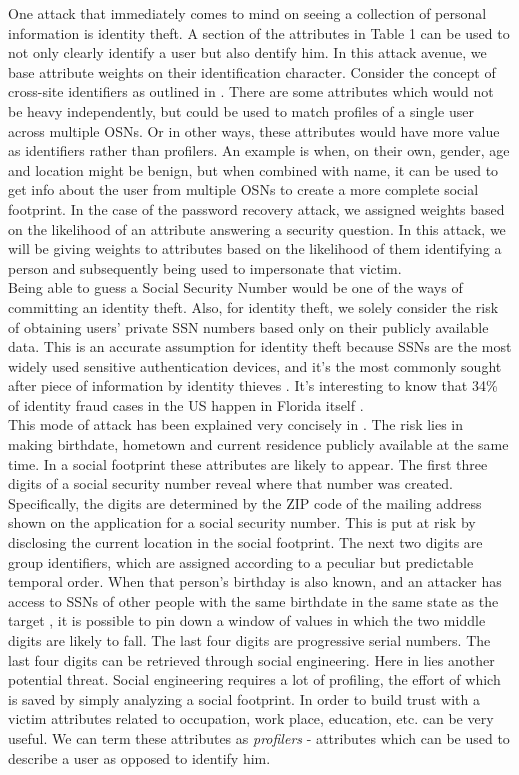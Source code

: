 \documentclass[10pt,conference]{IEEEtran}
\begin{document}
One attack that immediately comes to mind on seeing a collection of personal information is identity theft. A section of the attributes in Table 1 can be used to not only clearly identify a user but also dentify him. In this attack avenue, we base attribute weights on their identification character. Consider the concept of cross-site identifiers as outlined in \cite{emergingthreat}. There are some attributes which would not be heavy independently, but could be used to match profiles of a single user across multiple OSNs. Or in other ways, these attributes would have more value as identifiers rather than profilers. An example is when, on their own, gender, age and location might be benign, but when combined with name, it can be used to get info about the user from multiple OSNs to create a more complete social footprint. In the case of the password recovery attack, we assigned weights based on the likelihood of an attribute answering a security question. In this attack, we will be giving weights to attributes based on the likelihood of them identifying a person and subsequently being used to impersonate that victim.\\

Being able to guess a Social Security Number would be one of the ways of committing an identity theft. Also, for identity theft, we solely consider the risk of obtaining users’ private SSN numbers based only on their publicly available data. This is an accurate assumption for identity theft because SSNs are the most widely used sensitive authentication devices, and it’s the most commonly sought after piece of information by identity thieves \cite{ssn}. It’s interesting to know that 34\% of identity fraud cases in the US happen in Florida itself \cite{identityrisk}.\\

This mode of attack has been explained very concisely in \cite{facebook}. The risk lies in making birthdate, hometown and current residence publicly available at the same time. In a social footprint these attributes are likely to appear. The first three digits of a social security number reveal where that number was created. Specifically, the digits are determined by the ZIP code of the mailing address shown on the application for a social security number. This is put at risk by disclosing the current location in the social footprint. The next two digits are group identifiers, which are assigned according to a peculiar but predictable temporal order. When that person’s birthday is also known, and an attacker has access to SSNs of other people with the same birthdate in the same state as the target , it is possible to pin down a window of values in which the two middle digits are likely to fall. The last four digits are progressive serial numbers. The last four digits can be retrieved through social engineering. Here in lies another potential threat. Social engineering requires a lot of profiling, the effort of which is saved by simply analyzing a social footprint. In order to build trust with a victim attributes related to occupation, work place, education, etc. can be very useful. We can term these attributes as \textit{profilers} - attributes which can be used to describe a user as opposed to identify him.
\end{document}
